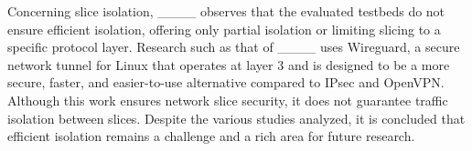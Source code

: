 Concerning slice isolation, ____ observes that the evaluated testbeds do not ensure efficient isolation, offering only partial isolation or limiting slicing to a specific protocol layer. Research such as that of ____ uses Wireguard, a secure network tunnel for Linux that operates at layer 3 and is designed to be a more secure, faster, and easier-to-use alternative compared to IPsec and OpenVPN. Although this work ensures network slice security, it does not guarantee traffic isolation between slices. Despite the various studies analyzed, it is concluded that efficient isolation remains a challenge and a rich area for future research.